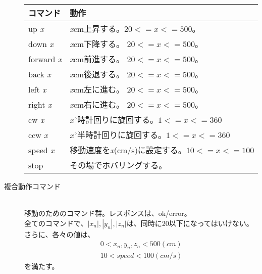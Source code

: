 \documentclass[a4paper, 12pt]{ltjsarticle}
\begin{document}
\begin{description}
\begin{table}[h]
\begin{tabular}{ll}
                コマンド & 動作 \\ \hline \hline
                up \emph{x} & \emph{x}cm上昇する。\(20<=x<=500\)。\\ \hline
                down \emph{x} & \emph{x}cm下降する。 \(20<=x<=500\)。 \\ \hline
                forward \emph{x} & \emph{x}cm前進する。 \(20<=x<=500\)。 \\ \hline
                back \emph{x} & \emph{x}cm後退する。 \(20<=x<=500\)。 \\ \hline
                left \emph{x} & \emph{x}cm左に進む。 \(20<=x<=500\)。　\\ \hline
                right \emph{x} & \emph{x}cm右に進む。 \(20<=x<=500\)。 \\ \hline
                cw \emph{x} & \(x^\circ\)時計回りに旋回する。\(1<=x<=360\) \\ \hline
                ccw \emph{x} & \(x^\circ\)半時計回りに旋回する。\(1<=x<=360\) \\ \hline
                speed \emph{x} & 移動速度を\emph{x}(cm/s)に設定する。\(10<=x<=100\) \\ \hline
                stop & その場でホバリングする。\\ \hline
            \end{tabular}
        \end{table}
    \item[複合動作コマンド]\mbox{}\\
        移動のためのコマンド群。レスポンスは、ok/error。\\
        全てのコマンドで、\(|x_n|,|y_n|,|z_n|\)は、同時に20以下になってはいけない。さらに、各々の値は、
        \begin{eqnarray}
            0 < x_n,y_n,z_n < 500 (cm) \nonumber \\
            10 < speed < 100 (cm/s) \nonumber
        \end{eqnarray}
        を満たす。


\end{description}
\end{document}
